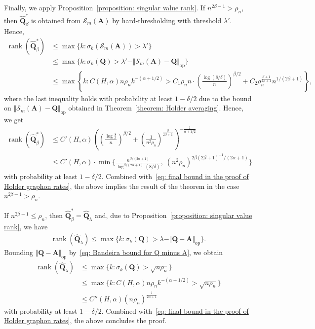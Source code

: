 \documentclass[11pt]{article}
\newcommand{\op}{\mathrm{op}}
\newcommand{\bA}{\bm{A}}
\newcommand{\bQ}{\bm{Q}}
\newcommand{\<}{\langle}
\renewcommand{\>}{\rangle}
\newcommand{\cS}{\mathcal{S}}
\DeclareMathOperator{\rank}{rank}
\theoremstyle{plain}
\theoremstyle{definition}
\theoremstyle{remark}
\begin{document}
{Finally, we apply Proposition~\ref{proposition: singular value rank}. If $n^{2\beta - 1} > \rho_n$, then $\widehat{\bQ}^*_{\beta}$ is obtained from $\cS_m(\bA)$ by hard-thresholding with threshold $\lambda'$. Hence, 
\begin{align*}
    \rank(\widehat{\bQ}^*_{\beta}) & \le \max \{k: \sigma_k(\cS_m(\bA)) > \lambda' \} \\
    & \le \max \{k: \sigma_k(\bQ) > \lambda' - \Vert \cS_m(\bA) - \bQ \Vert_{\op} \} \\
    & \le  \max \left \{k: C(H, \alpha) n \rho_n k^{-(\alpha + 1/2)} >  C_1\rho_n n \cdot \left ( \frac{\log(8/\delta)}{n} \right )^{\beta/2}  + C_2\rho_n^{\frac{\beta + 1}{2 \beta + 1}} n^{1/(2 \beta + 1)} \right \},
\end{align*}
where the last inequality holds with probability at least $1 - \delta/2$ due to the bound on $\Vert \cS_m(\bA) - \bQ \Vert_{\op}$ obtained in Theorem~\ref{theorem: Holder averaging}. Hence, we get
\begin{align*}
    \rank(\widehat{\bQ}^*_{\beta}) & \le C'(H, \alpha) \left (  \left (\frac{\log \frac{8}{\delta}}{n} \right )^{\beta/2} + \left ( \frac{1}{n^2 \rho_n}\right )^{\frac{\beta}{2 \beta + 1}} \right )^{- \frac{1}{\alpha + 1/2}} \\
    & \le  C'(H, \alpha) \cdot \min \Big \{\frac{n^{\beta/(2 \alpha + 1)}}{\log^{\beta/(2 \alpha + 1)}(8/\delta)}, \; (n^2 \rho_n)^{2\beta (2 \beta + 1)^{-1} / (2\alpha + 1)} \Big \}
\end{align*}
with probability at least $1 - \delta/2$. Combined with~\eqref{eq: final bound in the proof of Holder graphon rates}, the above implies the result of the theorem in the case $n^{2\beta - 1} > \rho_n$.

If $n^{2 \beta - 1} \le \rho_n$, then $\widehat{\bQ}^*_{\beta} = \widehat{\bQ}_\lambda$ and, due to Proposition~\ref{proposition: singular value rank}, we have
\begin{align*}
    \rank(\widehat{\bQ}_\lambda) \le \max \{k: \sigma_k(\bQ) > \lambda - \Vert \bQ - \bA \Vert_{\op} \}.
\end{align*}
Bounding $\Vert \bQ - \bA \Vert_{\op}$ by~\eqref{eq: Bandeira bound for Q minus A}, we obtain
\begin{align*}
    \rank(\widehat{\bQ}_\lambda) & \le \max \{k: \sigma_k(\bQ) > \sqrt{n \rho_n} \} \\
        & \le \max \{k: C(H, \alpha) n \rho_n k^{-(\alpha + 1/2)} > \sqrt{n \rho_n} \} \\
        & \le C''(H, \alpha) \left ( n \rho_n\right )^{\frac{1}{2 \alpha + 1}}
\end{align*}
with probability at least $1 - \delta/2$. Combined with~\eqref{eq: final bound in the proof of Holder graphon rates}, the above concludes the proof.

}
\end{document}
